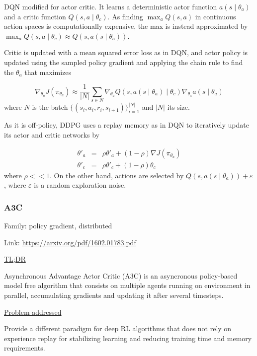 \documentclass[12pt, english]{article}
\begin{document}
DQN modified for actor critic. It learns a deterministic actor function $a(s \mid \theta_a)$ and a critic function $Q(s,a \mid \theta_c)$. As finding $\max_a Q(s,a)$ in continuous action spaces is computationally expensive, the max is instead approximated by $\max_a Q(s,a \mid \theta_c) \approx Q(s, a(s \mid \theta_a))$.

Critic is updated with a mean squared error loss as in DQN, and actor policy is updated using the sampled policy gradient and applying the chain rule to find the $\theta_a$ that maximizes

\begin{equation}
  \nabla_{\theta_a} J (\pi_{\theta_a}) \approx \frac{1}{|N|} \sum_{s \in N} \nabla_{\theta_a} Q(s,a(s \mid \theta_a) \mid \theta_c) \nabla_{\theta_a} a(s \mid \theta_a)
\end{equation}
%
where $N$ is the batch $\{(s_i, a_i, r_i, s_{i+1})\}^{|N|}_{i=1}$ and $|N|$ its size.

As it is off-policy, DDPG uses a replay memory as in DQN to iteratively update its actor and critic networks by

\begin{eqnarray}
  \theta'_a &=& \rho \theta'_a + (1-\rho) \nabla J (\pi_{\theta_a}) \\
  \theta'_c &=& \rho \theta'_c + (1-\rho) \theta_c
\end{eqnarray}
%
where $\rho << 1$.
On the other hand, actions are selected by $Q(s, a(s \mid \theta_a)) + \varepsilon$, where $\varepsilon$ is a random exploration noise.


\subsubsection{A3C}
\label{A3C}

Family: policy gradient, distributed

Link: \url{https://arxiv.org/pdf/1602.01783.pdf}

\underline{TL;DR}

Asynchronous Advantage Actor Critic (A3C) \cite{mnih_asynchronous_2016} is an asyncronous policy-based model free algorithm that consists on multiple agents running on environment in parallel, accumulating gradients and updating it after several timesteps.

\underline{Problem addressed}

Provide a different paradigm for deep RL algorithms that does not rely on experience replay for stabilizing learning and reducing training time and memory requirements.
\end{document}
